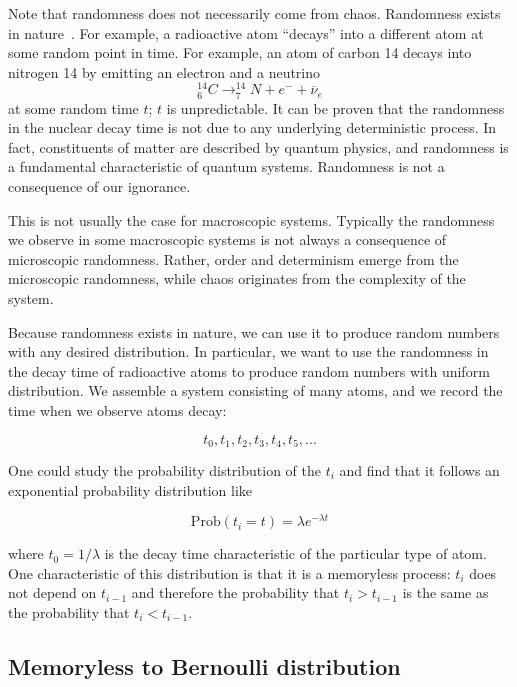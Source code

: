 \documentclass[justified,sixbynine]{tufte-book}
\theoremstyle{plain}%
\theoremstyle{definition}
\theoremstyle{remark}
\begin{document}
\begin{fullwidth}
Note that randomness does not necessarily come from chaos.
Randomness exists in nature~\cite{determinism}\cite{decay}.
For example, a radioactive atom ``decays'' into a different atom
at some random point in time. For example, an atom of carbon 14 decays into nitrogen 14 by emitting an electron and a neutrino
\begin{equation}
_6^{14}C\longrightarrow _7^{14}N+e^{-}+\overline{\nu }_e
\end{equation}
at some random time $t$; $t$ is unpredictable. It can be proven that the
randomness in the nuclear decay time is not due to any underlying
deterministic process. In fact, constituents of matter are
described by quantum physics, and randomness is a fundamental characteristic
of quantum systems. Randomness is not a consequence of our ignorance.

This is not usually the case for macroscopic systems. Typically the
randomness we observe in some macroscopic systems is not always a
consequence of microscopic randomness. Rather, order and determinism
emerge from the microscopic randomness, while chaos originates from the complexity of
the system.

Because randomness exists in nature, we can use it to produce random numbers
with any desired distribution. In particular, we want to use the randomness
in the decay time of radioactive atoms to produce random numbers with
uniform distribution. We assemble a system consisting of many
atoms, and we record the time when we observe atoms decay:

\begin{equation}
t_0,t_1,t_2,t_3,t_4,t_5,...
\end{equation}

One could study the probability distribution of the $t_i$ and find
that it follows an exponential probability distribution like

\begin{equation}
\textrm{Prob}(t_i = t)=\lambda e^{-\lambda t}
\end{equation}

where $t_0=1/\lambda $ is the decay time characteristic of the particular
type of atom. One characteristic of this distribution is that it is a memoryless process: $t_i$ does not depend on $t_{i-1}$ and therefore the probability that $t_i>t_{i-1}$ is the same as the probability that $t_i<t_{i-1}$.

\goodbreak\subsection{Memoryless to Bernoulli distribution}


\end{fullwidth}
\end{document}

